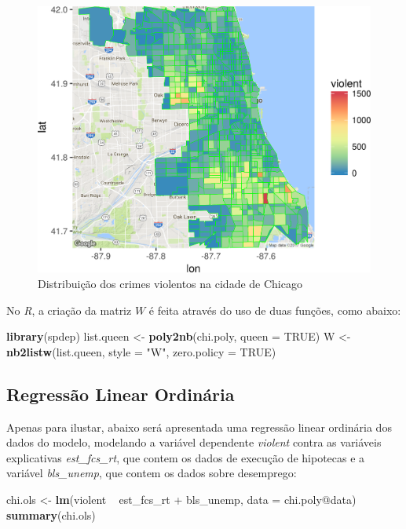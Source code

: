 \documentclass[12pt,]{article}
\newenvironment{Shaded}{\begin{snugshade}}{\end{snugshade}}
\newcommand{\KeywordTok}[1]{\textcolor[rgb]{0.13,0.29,0.53}{\textbf{{#1}}}}
\newcommand{\DataTypeTok}[1]{\textcolor[rgb]{0.13,0.29,0.53}{{#1}}}
\newcommand{\StringTok}[1]{\textcolor[rgb]{0.31,0.60,0.02}{{#1}}}
\newcommand{\OtherTok}[1]{\textcolor[rgb]{0.56,0.35,0.01}{{#1}}}
\newcommand{\NormalTok}[1]{{#1}}
\begin{document}
\begin{figure}[H]

{\centering \includegraphics[width=.65\linewidth]{sfiles/plot_mash-1} 

}

\caption{Distribuição dos crimes violentos na cidade de Chicago}\label{fig:plot_mash}
\end{figure}

No \emph{R}, a criação da matriz \(W\) é feita através do uso de duas
funções, como abaixo:

\begin{Shaded}
\begin{Highlighting}[]
\KeywordTok{library}\NormalTok{(spdep)}
\NormalTok{list.queen <-}\StringTok{ }\KeywordTok{poly2nb}\NormalTok{(chi.poly, }\DataTypeTok{queen =} \OtherTok{TRUE}\NormalTok{)}
\NormalTok{W <-}\StringTok{ }\KeywordTok{nb2listw}\NormalTok{(list.queen, }\DataTypeTok{style =} \StringTok{"W"}\NormalTok{, }\DataTypeTok{zero.policy =} \OtherTok{TRUE}\NormalTok{)}
\end{Highlighting}
\end{Shaded}

\subsection{Regressão Linear
Ordinária}\label{regressao-linear-ordinaria}

Apenas para ilustar, abaixo será apresentada uma regressão linear
ordinária dos dados do modelo, modelando a variável dependente
\emph{violent} contra as variáveis explicativas \emph{est\_fcs\_rt}, que
contem os dados de execução de hipotecas e a variável \emph{bls\_unemp},
que contem os dados sobre desemprego:

\begin{Shaded}
\begin{Highlighting}[]
\NormalTok{chi.ols <-}\StringTok{ }\KeywordTok{lm}\NormalTok{(violent ~}\StringTok{ }\NormalTok{est_fcs_rt +}\StringTok{ }\NormalTok{bls_unemp, }\DataTypeTok{data =} \NormalTok{chi.poly@data)}
\KeywordTok{summary}\NormalTok{(chi.ols)}
\end{Highlighting}
\end{Shaded}
\end{document}
